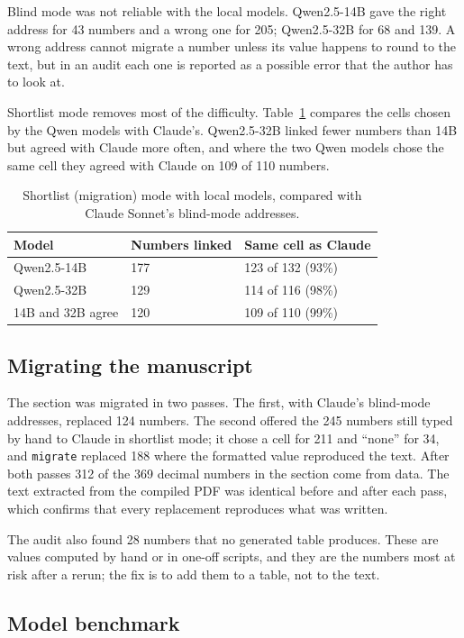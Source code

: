 Blind mode was not reliable with the local models. Qwen2.5-14B gave the right address for 43
numbers and a wrong one for 205; Qwen2.5-32B for 68 and 139. A wrong address cannot migrate a
number unless its value happens to round to the text, but in an audit each one is reported as a
possible error that the author has to look at.

Shortlist mode removes most of the difficulty. Table~\ref{tab:shortlist} compares the cells chosen
by the Qwen models with Claude's. Qwen2.5-32B linked fewer numbers than 14B but agreed with Claude
more often, and where the two Qwen models chose the same cell they agreed with Claude on 109 of
110 numbers.

\begin{table}[t]
\centering
\caption{Shortlist (migration) mode with local models, compared with Claude Sonnet's blind-mode
addresses.}
\label{tab:shortlist}
\begin{tabular}{lll}
\toprule
Model & Numbers linked & Same cell as Claude \\
\midrule
Qwen2.5-14B & 177 & 123 of 132 (93\%) \\
Qwen2.5-32B & 129 & 114 of 116 (98\%) \\
14B and 32B agree & 120 & 109 of 110 (99\%) \\
\bottomrule
\end{tabular}
\end{table}

\subsection{Migrating the manuscript}

The section was migrated in two passes. The first, with Claude's blind-mode addresses, replaced
124 numbers. The second offered the 245 numbers still typed by hand to Claude in shortlist mode;
it chose a cell for 211 and ``none'' for 34, and \texttt{migrate} replaced 188 where the formatted
value reproduced the text. After both passes 312 of the 369 decimal numbers in the section come
from data. The text extracted from the compiled PDF was identical before and after each pass,
which confirms that every replacement reproduces what was written.

The audit also found 28 numbers that no generated table produces. These are values computed by
hand or in one-off scripts, and they are the numbers most at risk after a rerun; the fix is to
add them to a table, not to the text.

\subsection{Model benchmark}

